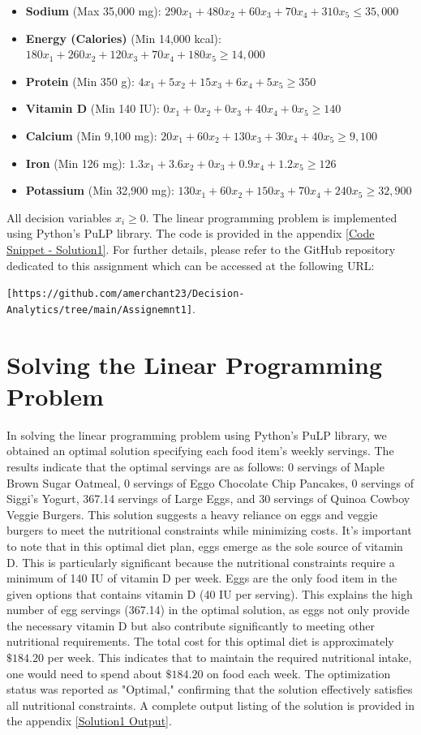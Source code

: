 \documentclass{article}
\begin{document}
\begin{itemize}
    \item \textbf{Sodium} (Max 35,000 mg): $ 290x_1 + 480x_2 + 60x_3 + 70x_4 + 310x_5 \leq 35,000 $
    \item \textbf{Energy (Calories)} (Min 14,000 kcal): $ 180x_1 + 260x_2 + 120x_3 + 70x_4 + 180x_5 \geq 14,000 $
    \item \textbf{Protein} (Min 350 g): $ 4x_1 + 5x_2 + 15x_3 + 6x_4 + 5x_5 \geq 350 $
    \item \textbf{Vitamin D} (Min 140 IU): $ 0x_1 + 0x_2 + 0x_3 + 40x_4 + 0x_5 \geq 140 $
    \item \textbf{Calcium} (Min 9,100 mg): $ 20x_1 + 60x_2 + 130x_3 + 30x_4 + 40x_5 \geq 9,100 $
    \item \textbf{Iron} (Min 126 mg): $ 1.3x_1 + 3.6x_2 + 0x_3 + 0.9x_4 + 1.2x_5 \geq 126 $
    \item \textbf{Potassium} (Min 32,900 mg): $ 130x_1 + 60x_2 + 150x_3 + 70x_4 + 240x_5 \geq 32,900 $
\end{itemize}
All decision variables \( x_i \geq 0 \). 
The linear programming problem is implemented using Python's PuLP library. The code is provided in the appendix \ref{Code Snippet - Solution1}. For further details, please refer to the GitHub repository dedicated to this assignment which can be accessed at the following URL: 

\texttt{[https://github.com/amerchant23/Decision-Analytics/tree/main/Assignemnt1]}.


\section{Solving the Linear Programming Problem}

In solving the linear programming problem using Python's PuLP library, we obtained an optimal solution specifying each food item's weekly servings. The results indicate that the optimal servings are as follows: 0 servings of Maple Brown Sugar Oatmeal, 0 servings of Eggo Chocolate Chip Pancakes, 0 servings of Siggi’s Yogurt, 367.14 servings of Large Eggs, and 30 servings of Quinoa Cowboy Veggie Burgers. This solution suggests a heavy reliance on eggs and veggie burgers to meet the nutritional constraints while minimizing costs. It's important to note that in this optimal diet plan, eggs emerge as the sole source of vitamin D. This is particularly significant because the nutritional constraints require a minimum of 140 IU of vitamin D per week. Eggs are the only food item in the given options that contains vitamin D (40 IU per serving). This explains the high number of egg servings (367.14) in the optimal solution, as eggs not only provide the necessary vitamin D but also contribute significantly to meeting other nutritional requirements. The total cost for this optimal diet is approximately $\$184.20$ per week. This indicates that to maintain the required nutritional intake, one would need to spend about $\$184.20$ on food each week. The optimization status was reported as "Optimal," confirming that the solution effectively satisfies all nutritional constraints. A complete output listing of the solution is provided in the appendix \ref{Solution1 Output}.
\end{document}
